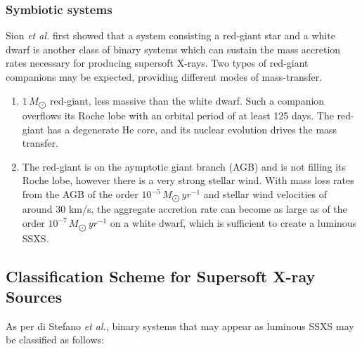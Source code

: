 			\subsubsection{Symbiotic systems}
				Sion \emph{et al.}\cite{sion94} first showed that a system consisting a red-giant star and a white dwarf is another class of binary systems which can sustain the mass accretion rates necessary for producing supersoft X-rays. Two types of red-giant companions may be expected, providing different modes of mass-transfer.
				
				\begin{enumerate}
					\item $1\,M_{\bigodot}$ red-giant, less massive than the white dwarf. Such a companion overflows its Roche lobe with an orbital period of at least 125 days. The red-giant has a degenerate He core, and its nuclear evolution drives the mass transfer.
					\item The red-giant is on the aymptotic giant branch (AGB) and is not filling its Roche lobe, however there is a very strong stellar wind. With mass loss rates from the AGB of the order $10^{-5}\,M_{\bigodot}\,yr^{-1}$ and stellar wind velocities of around 30 km/s, the aggregate accretion rate can become as large as of the order $10^{-7}\,M_{\bigodot}\,yr^{-1}$ on a white dwarf, which is sufficient to create a luminous SSXS.
				\end{enumerate}
		
		\newpage
		\subsection{Classification Scheme for Supersoft X-ray Sources} \label{introduction:current_status:sss-classification}
			As per di Stefano \emph{et al.}\cite{distefano96}, binary systems that may appear as luminous SSXS may be classified as follows:
			
